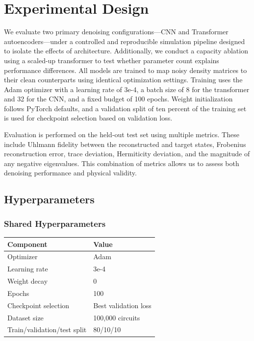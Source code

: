 \documentclass[a4paper, 11pt, colorlinks=true, citecolor=., linkcolor=black, urlcolor=black]{article}
\begin{document}
\section{Experimental Design}
\label{sec:orgdef8ee8}
We evaluate two primary denoising configurations—CNN and Transformer autoencoders—under a controlled and reproducible simulation pipeline designed to isolate the effects of architecture. Additionally, we conduct a capacity ablation using a scaled-up transformer to test whether parameter count explains performance differences. All models are trained to map noisy density matrices to their clean counterparts using identical optimization settings. Training uses the Adam optimizer with a learning rate of 3e-4, a batch size of 8 for the transformer and 32 for the CNN, and a fixed budget of 100 epochs. Weight initialization follows PyTorch defaults, and a validation split of ten percent of the training set is used for checkpoint selection based on validation loss.

Evaluation is performed on the held-out test set using multiple metrics. These include Uhlmann fidelity between the reconstructed and target states, Frobenius reconstruction error, trace deviation, Hermiticity deviation, and the magnitude of any negative eigenvalues. This combination of metrics allows us to assess both denoising performance and physical validity.
\subsection{Hyperparameters}
\label{sec:orgf41377d}
\subsubsection{Shared Hyperparameters}
\label{sec:org9a1096e}

\begin{center}
\begin{tabular}{ll}
Component & Value\\
\hline
Optimizer & Adam\\
Learning rate & 3e-4\\
Weight decay & 0\\
Epochs & 100\\
Checkpoint selection & Best validation loss\\
Dataset size & 100,000 circuits\\
Train/validation/test split & 80/10/10\\
\end{tabular}
\end{center}
\end{document}
